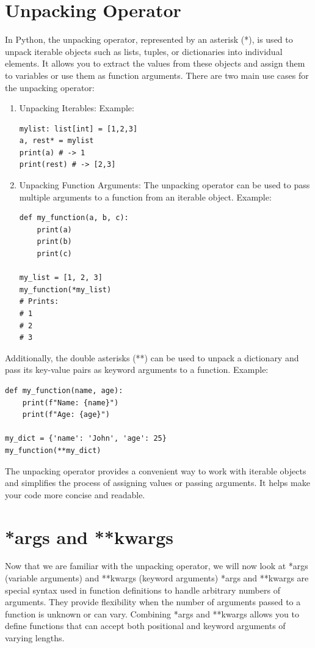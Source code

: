 \documentclass{report}
\begin{document}
    \pagebreak \bigbreak \noindent
    \section{Unpacking Operator}
    In Python, the unpacking operator, represented by an asterisk (*), is used to unpack iterable objects such as lists, tuples, or dictionaries into individual elements. It allows you to extract the values from these objects and assign them to variables or use them as function arguments.
    \bigbreak \noindent 
    There are two main use cases for the unpacking operator:
    \begin{enumerate}
        \item Unpacking Iterables: 
        \bigbreak \noindent 
        Example:
        \begin{verbatim}
mylist: list[int] = [1,2,3]
a, rest* = mylist
print(a) # -> 1
print(rest) # -> [2,3]
        \end{verbatim}
    \item Unpacking Function Arguments:
    The unpacking operator can be used to pass multiple arguments to a function from an iterable object.
    \bigbreak \noindent 
    Example:
    \begin{verbatim}
def my_function(a, b, c):
    print(a)
    print(b)
    print(c)

my_list = [1, 2, 3]
my_function(*my_list)
# Prints:
# 1
# 2
# 3
    \end{verbatim}
    \end{enumerate}
    \bigbreak \noindent 
    Additionally, the double asterisks (**) can be used to unpack a dictionary and pass its key-value pairs as keyword arguments to a function.
    \bigbreak \noindent 
    Example:
    \begin{verbatim}
def my_function(name, age):
    print(f"Name: {name}")
    print(f"Age: {age}")

my_dict = {'name': 'John', 'age': 25}
my_function(**my_dict)
    \end{verbatim}
    \bigbreak \noindent 
    The unpacking operator provides a convenient way to work with iterable objects and simplifies the process of assigning values or passing arguments. It helps make your code more concise and readable.

    \pagebreak \bigbreak \noindent
    \section{*args and **kwargs}
    \bigbreak \noindent
    Now that we are familiar with the unpacking operator, we will now look at *args (variable arguments) and **kwargs (keyword arguments)
    \bigbreak \noindent 
    *args and **kwargs are special syntax used in function definitions to handle arbitrary numbers of arguments. They provide flexibility when the number of arguments passed to a function is unknown or can vary.
    \bigbreak \noindent     
    Combining *args and **kwargs allows you to define functions that can accept both positional and keyword arguments of varying lengths.
    \bigbreak \noindent 
\end{document}
